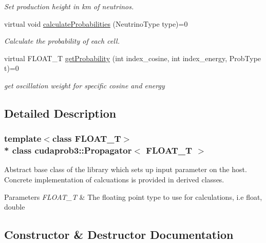 \begin{DoxyCompactItemize}
\begin{DoxyCompactList}\small\item\em Set production height in km of neutrinos. \end{DoxyCompactList}\item 
virtual void \hyperlink{classcudaprob3_1_1Propagator_abe3045e287c6a0646474189b3cff14c7}{calculate\+Probabilities} (Neutrino\+Type type)=0
\begin{DoxyCompactList}\small\item\em Calculate the probability of each cell. \end{DoxyCompactList}\item 
virtual F\+L\+O\+A\+T\+\_\+T \hyperlink{classcudaprob3_1_1Propagator_a279ff90463e887754db8379c9582c943}{get\+Probability} (int index\+\_\+cosine, int index\+\_\+energy, Prob\+Type t)=0
\begin{DoxyCompactList}\small\item\em get oscillation weight for specific cosine and energy \end{DoxyCompactList}\end{DoxyCompactItemize}


\subsection{Detailed Description}
\subsubsection*{template$<$class F\+L\+O\+A\+T\+\_\+T$>$\\*
class cudaprob3\+::\+Propagator$<$ F\+L\+O\+A\+T\+\_\+\+T $>$}

Abstract base class of the library which sets up input parameter on the host. Concrete implementation of calcuations is provided in derived classes. 


\begin{DoxyParams}{Parameters}
{\em F\+L\+O\+A\+T\+\_\+T} & The floating point type to use for calculations, i.\+e float, double \\
\hline
\end{DoxyParams}


\subsection{Constructor \& Destructor Documentation}
